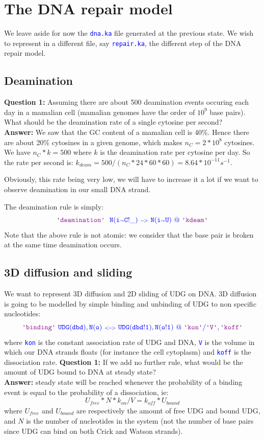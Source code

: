 \documentclass[11pt]{article}
\makeatletter
\def\ttt#1{\texttt{\textcolor{blue}{#1}}}
\def\mtt#1{{\tt{\color{blue} #1}}}
\def\lab#1{\hbox{\ttt{\color{Plum}\textquotesingle #1\textquotesingle}}}
\def\int{{\scriptstyle\sim}}
\def\Krule#1#2#3{\color{blue}\mtt{{\color{blue}\lab{#1}\ #2\ @\ #3}}}
\def\Kar{\ {\scriptstyle\tt-\! >}\ }
\def\Kbar{\ {\scriptstyle\tt<\!-\! >}\ }
\makeatother
\begin{document}
\section{The DNA repair model}
We leave aside for now the \ttt{dna.ka} file generated at the previous state. We wish to represent in a different file, say \ttt{repair.ka}, the different step of the DNA repair model.

\subsection{Deamination}

\noindent\textbf{Question 1:} Assuming there are about 500 deamination events occuring each day in a mamalian cell (mamalian genomes have the order of $10^9$ base pairs). What should be the deamination rate of a single cytosine per second?
\\\textbf{Answer:} We saw that the GC content of a mamalian cell is 40\%. Hence there are about 20\% cytosines in a given genome, which makes $n_C=2*10^8$ cytosines. We have $n_C * k=500$ where $k$ is the deamination rate per cytosine per day. So the rate per second is: $k_{\mathit{deam}}=500/(n_C*24*60*60)=8.64*10^{-11} s^{-1}$. 

Obviously, this rate being very low, we will have to increase it a lot if we want to observe deamination in our small DNA strand.

The deamination rule is simply:
$$
\Krule{deamination}{\ N(i\int C!\_)\Kar N(i\int U)}{\lab{kdeam}}
$$
Note that the above rule is not atomic: we consider that the base pair is broken at the same time deamination occurs.

\subsection{3D diffusion and sliding}
We want to represent 3D diffusion and 2D sliding of UDG on DNA. 3D diffusion is going to be modelled by simple binding and unbinding of UDG to non specific nucleotides:
$$ 
\Krule{binding}{UDG(dbd),N(o)\Kbar UDG(dbd!1),N(o!1)}{\lab{kon}/\lab{V},\lab{koff}}
$$
where \lab{kon} is the constant association rate of UDG and DNA, \lab{V} is the volume in which our DNA strands floats (for instance the cell cytoplasm) and \lab{koff} is the dissociation rate. 
\vskip 0.25cm
\noindent\textbf{Question 1:} If we add no further rule, what would be the amount of UDG bound to DNA at steady state?
\\\textbf{Answer:} steady state will be reached whenever the probability of a binding event is equal to the probability of a dissociation, ie: $$U_{\mathit{free}}*N*k_{\mathit{on}}/V=k_{\mathit{off}}*U_{\mathit{bound}}$$ where $U_{\mathit{free}}$ and $U_{\mathit{bound}}$ are respectively the amount of free UDG and bound UDG, and $N$ is the number of nucleotides in the system (not the number of base pairs since UDG can bind on both Crick and Watson strands).
\end{document}
